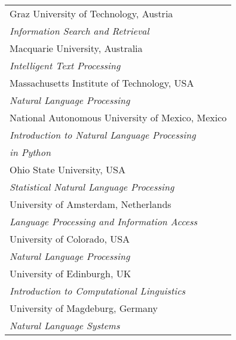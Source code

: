 \documentclass[11pt]{article}
\begin{document}
\begin{table}[bt]
\small\noindent
\begin{boxedminipage}{\linewidth}
\begin{tabular}{l}

Graz University of Technology, Austria \\
\hspace{2ex}
\textit{Information Search and Retrieval} \\[.5ex]

Macquarie University, Australia \\
\hspace{2ex}
\textit{Intelligent Text Processing} \\[.5ex]

Massachusetts Institute of Technology, USA \\
\hspace{2ex}
\textit{Natural Language Processing} \\[.5ex]

National Autonomous University of Mexico, Mexico \\
\hspace{2ex}
\textit{Introduction to Natural Language Processing}\\
\hspace{2ex}
\textit{in Python} \\[.5ex]

Ohio State University, USA \\
\hspace{2ex}
\textit{Statistical Natural Language Processing}\\[.5ex]

University of Amsterdam, Netherlands \\
\hspace{2ex}
\textit{Language Processing and Information Access} \\[.5ex]

University of Colorado, USA \\
\hspace{2ex}
\textit{Natural Language Processing} \\[.5ex]

University of Edinburgh, UK \\
\hspace{2ex}
\textit{Introduction to Computational Linguistics} \\[.5ex]

University of Magdeburg, Germany \\
\hspace{2ex}
\textit{Natural Language Systems} \\[.5ex]


\end{tabular}
\end{boxedminipage}
\end{table}
\end{document}
